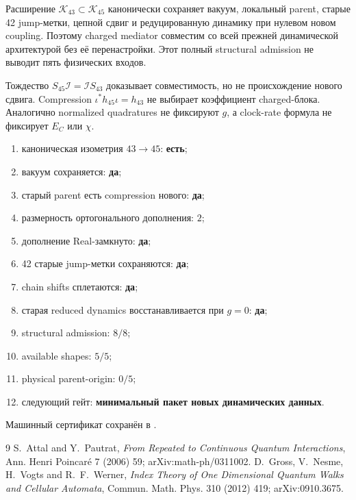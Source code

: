 \begin{theorem}
Расширение $\mathcal K_{43}\subset\mathcal K_{45}$ канонически сохраняет
вакуум, локальный parent, старые 42 jump-метки, цепной сдвиг и редуцированную
динамику при нулевом новом coupling. Поэтому charged mediator совместим со
всей прежней динамической архитектурой без её перенастройки. Этот полный
structural admission не выводит пять физических входов.
\end{theorem}

\begin{nogocriterion}
Тождество $S_{45}\mathcal I=\mathcal I S_{43}$ доказывает совместимость, но
не происхождение нового сдвига. Compression $\iota^*h_{45}\iota=h_{43}$ не
выбирает коэффициент charged-блока. Аналогично normalized quadratures не
фиксируют $g$, а clock-rate формула не фиксирует $E_C$ или $\chi$.
\end{nogocriterion}

\begin{protocol}\begin{enumerate}
\item каноническая изометрия $43\to45$: \textbf{есть};
\item вакуум сохраняется: \textbf{да};
\item старый parent есть compression нового: \textbf{да};
\item размерность ортогонального дополнения: \textbf{$2$};
\item дополнение Real-замкнуто: \textbf{да};
\item 42 старые jump-метки сохраняются: \textbf{да};
\item chain shifts сплетаются: \textbf{да};
\item старая reduced dynamics восстанавливается при $g=0$: \textbf{да};
\item structural admission: \textbf{$8/8$};
\item available shapes: \textbf{$5/5$};
\item physical parent-origin: \textbf{$0/5$};
\item следующий гейт: \textbf{минимальный пакет новых динамических данных}.
\end{enumerate}\end{protocol}

Машинный сертификат сохранён в
.

\begin{thebibliography}{9}
 S.~Attal and Y.~Pautrat,
\emph{From Repeated to Continuous Quantum Interactions},
Ann. Henri Poincar\'e 7 (2006) 59; arXiv:math-ph/0311002.
 D.~Gross, V.~Nesme, H.~Vogts and
R.~F.~Werner, \emph{Index Theory of One Dimensional Quantum Walks and
Cellular Automata}, Commun. Math. Phys. 310 (2012) 419;
arXiv:0910.3675.
\end{thebibliography}